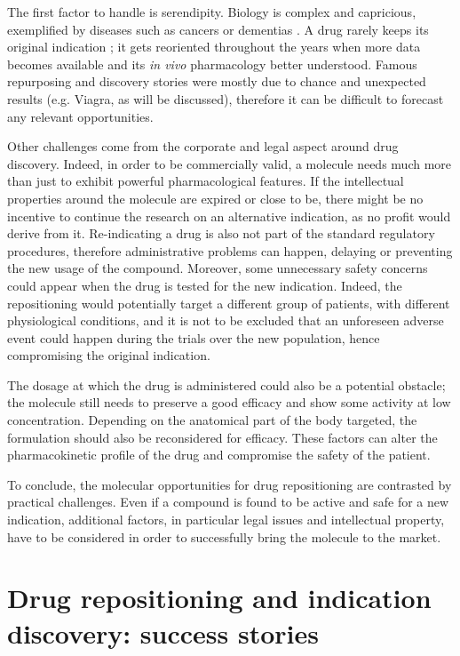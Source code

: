 The first factor to handle is serendipity. Biology is complex and capricious, exemplified by diseases such as cancers or dementias \citep{ashburn2004drug}. A drug rarely keeps its original indication \citep{barratt2012drug}; it gets reoriented throughout the years when more data becomes available and its \emph{in vivo} pharmacology better understood. Famous repurposing and discovery stories were mostly due to chance and unexpected results (e.g. Viagra, as will be discussed), therefore it can be difficult to forecast any relevant opportunities.

Other challenges come from the corporate and legal aspect around drug discovery. Indeed, in order to be commercially valid, a molecule needs much more than just to exhibit powerful pharmacological features. If the intellectual properties around the molecule are expired or close to be, there might be no incentive to continue the research on an alternative indication, as no profit would derive from it. Re-indicating a drug is also not part of the standard regulatory procedures, therefore administrative problems can happen, delaying or preventing the new usage of the compound. Moreover, some unnecessary safety concerns could appear when the drug is tested for the new indication. Indeed, the repositioning would potentially target a different group of patients, with different physiological conditions, and it is not to be excluded that an unforeseen adverse event could happen during the trials over the new population, hence compromising the original indication.

The dosage at which the drug is administered could also be a potential obstacle; the molecule still needs to preserve a good efficacy and show some activity at low concentration. Depending on the anatomical part of the body targeted, the formulation should also be reconsidered for efficacy. These factors can alter the pharmacokinetic profile of the drug and compromise the safety of the patient.

To conclude, the molecular opportunities for drug repositioning are contrasted by practical challenges. Even if a compound is found to be active and safe for a new indication, additional factors, in particular legal issues and intellectual property, have to be considered in order to successfully bring the molecule to the market.

\section{Drug repositioning and indication discovery: success stories}


